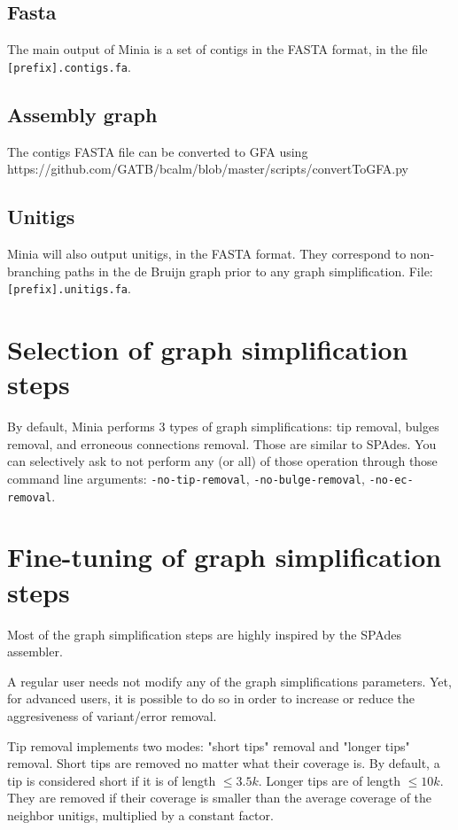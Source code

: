 \documentclass[a4paper]{article}
\begin{document}
\subsection{Fasta}

The main output of Minia is a set of contigs in the FASTA format, in the file \verb+[prefix].contigs.fa+. 

\subsection{Assembly graph}

The contigs FASTA file can be converted to GFA using https://github.com/GATB/bcalm/blob/master/scripts/convertToGFA.py

\subsection*{Unitigs}

Minia will also output unitigs, in the FASTA format. They correspond to non-branching paths in the de Bruijn graph prior to any graph simplification. File: \verb+[prefix].unitigs.fa+. 

\section{Selection of graph simplification steps}

By default, Minia performs 3 types of graph simplifications: tip removal, bulges removal, and erroneous connections removal. Those are similar to SPAdes. You can selectively ask to not perform any (or all) of those operation through those command line arguments: \verb+-no-tip-removal+, \verb+-no-bulge-removal+, \verb+-no-ec-removal+.

\section{Fine-tuning of graph simplification steps}

Most of the graph simplification steps are highly inspired by the SPAdes assembler.

A regular user needs not modify any of the graph simplifications parameters.
Yet, for advanced users, it is possible to do so in order to increase or reduce the aggresiveness of variant/error removal.

Tip removal implements two modes: "short tips" removal and "longer tips" removal. Short tips are removed no matter what their coverage is. By default, a tip is considered short if it is of length $\leq 3.5k$. Longer tips are of length $\leq 10k$. They are removed if their coverage is smaller than the average coverage of the neighbor unitigs, multiplied by a constant factor.
\end{document}
